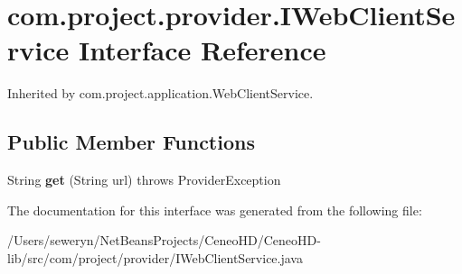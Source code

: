 \section{com.\+project.\+provider.\+I\+Web\+Client\+Service Interface Reference}
\label{interfacecom_1_1project_1_1provider_1_1_i_web_client_service}


Inherited by com.\+project.\+application.\+Web\+Client\+Service.

\subsection*{Public Member Functions}
\begin{DoxyCompactItemize}
\item 
\mbox{\label{interfacecom_1_1project_1_1provider_1_1_i_web_client_service_a99c8efa326d6f221be7aaf5e82f15b79}} 
String {\bfseries get} (String url)  throws Provider\+Exception
\end{DoxyCompactItemize}


The documentation for this interface was generated from the following file\+:\begin{DoxyCompactItemize}
\item 
/\+Users/seweryn/\+Net\+Beans\+Projects/\+Ceneo\+H\+D/\+Ceneo\+H\+D-\/lib/src/com/project/provider/I\+Web\+Client\+Service.\+java\end{DoxyCompactItemize}
